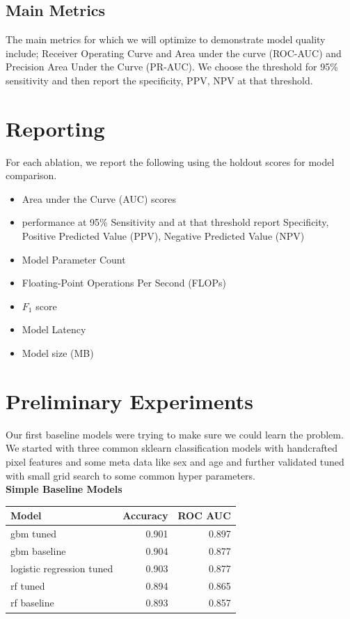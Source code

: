 \documentclass[conference]{IEEEtran}
\begin{document}
\subsection*{Main Metrics}

The main metrics for which we will optimize to demonstrate model quality include; Receiver Operating Curve and Area under the curve (ROC-AUC) and Precision Area Under the Curve (PR-AUC).
We choose the threshold for 95\% sensitivity and then report the specificity, PPV, NPV at that threshold.


\section*{Reporting}
For each ablation, we report the following using the holdout scores for model comparison.

\begin{itemize}
    \item Area under the Curve (AUC) scores 
    \item performance at 95\% Sensitivity  and at that threshold report Specificity, Positive Predicted Value (PPV), Negative Predicted Value (NPV)
    \item Model Parameter Count
    \item Floating-Point Operations Per Second (FLOPs)
    \item $F_1$ score
    \item Model Latency
    \item Model size (MB)
\end{itemize}


\section*{Preliminary Experiments}

Our first baseline models were trying to make sure we could learn the problem. We started with three common sklearn classification models with handcrafted pixel features and some meta data like sex and age and further validated tuned with small grid search to some common hyper parameters.\\

\textbf{Simple Baseline Models}\\

\begin{tabular}{lrr}
\toprule
Model & Accuracy & ROC AUC \\
\midrule
gbm tuned & 0.901 & 0.897 \\
gbm baseline & 0.904 & 0.877 \\
logistic regression tuned & 0.903 & 0.877 \\
rf tuned & 0.894 & 0.865 \\
rf baseline & 0.893 & 0.857 \\
\bottomrule
\end{tabular}\\
\end{document}
